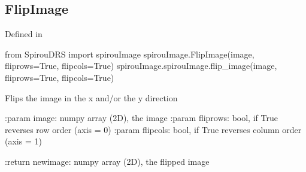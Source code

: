 \noindent\begin{minipage}{\textwidth}
\subsection{FlipImage}

Defined in \spirouImage{}

\begin{pythonbox}
from SpirouDRS import spirouImage
spirouImage.FlipImage(image, fliprows=True, flipcols=True)
spirouImage.spirouImage.flip_image(image, fliprows=True, flipcols=True)
\end{pythonbox}

\begin{pythondocstring}
Flips the image in the x and/or the y direction

:param image: numpy array (2D), the image
:param fliprows: bool, if True reverses row order (axis = 0)
:param flipcols: bool, if True reverses column order (axis = 1)

:return newimage: numpy array (2D), the flipped image
\end{pythondocstring}
\end{minipage}



